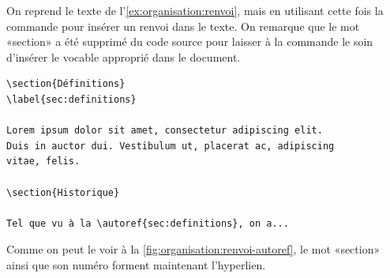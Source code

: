 \begin{exemple}
  \label{ex:organisation:renvoi-autoref}
  On reprend le texte de l'\autoref{ex:organisation:renvoi}, mais en
  utilisant cette fois la commande \cmd{\autoref} pour insérer un
  renvoi dans le texte. On remarque que le mot «section» a été
  supprimé du code source pour laisser à la commande le soin d'insérer
  le vocable approprié dans le document.
\begin{lstlisting}[emph={\label,\autoref}]
\section{Définitions}
\label{sec:definitions}

Lorem ipsum dolor sit amet, consectetur adipiscing elit.
Duis in auctor dui. Vestibulum ut, placerat ac, adipiscing
vitae, felis.

\section{Historique}

Tel que vu à la \autoref{sec:definitions}, on a...
\end{lstlisting}
  Comme on peut le voir à la
  \autoref{fig:organisation:renvoi-autoref}, le mot «section» ainsi
  que son numéro forment maintenant l'hyperlien.


\end{exemple}
